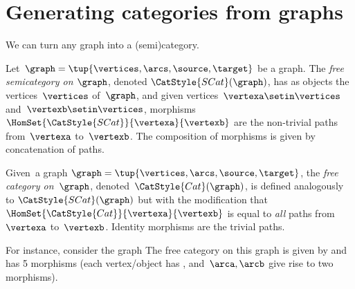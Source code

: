 
\section[Categories from graphs]{Generating categories from graphs}
\label{sec:catsfromgraphs}

We can turn any graph into a (semi)category.

\begin{ctdefinition}
    \label{def:free-semicategory}
    Let~$\graph=\tup{\vertices,\arcs,\source,\target}$ be a graph.
    The \emph{free semicategory on $\graph$}, denoted $\CatStyle{SCat}(\graph)$, has as objects the vertices~$\vertices$ of~$\graph$, and given vertices~$\vertexa\setin \vertices$ and~$\vertexb\setin \vertices$, morphisms~$\HomSet{\CatStyle{SCat}}{\vertexa}{\vertexb}$ are the non-trivial paths from~$\vertexa$ to~$\vertexb$.
    The composition of morphisms is given by concatenation of paths.
\end{ctdefinition}

\begin{ctdefinition}
    \label{def:free-category}
    Given~a graph $\graph=\tup{\vertices,\arcs,\source,\target}$, the \emph{free category on~$\graph$}, denoted~$\CatStyle{Cat}(\graph)$, is defined analogously to $\CatStyle{SCat}(\graph)$ but with the modification that $\HomSet{\CatStyle{Cat}}{\vertexa}{\vertexb}$ is equal to \emph{all} paths from~$\vertexa$ to~$\vertexb$.
    Identity morphisms are the trivial paths.
\end{ctdefinition}

For instance, consider the graph
%
%
The free category on this graph is given by
%
%
and has 5 morphisms (each vertex/object has , and~$\arca,\arcb$ give rise to two morphisms).


